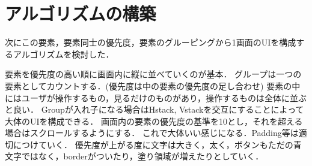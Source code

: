 \section{アルゴリズムの構築}
次にこの要素，要素同士の優先度，要素のグルーピングから1画面のUIを構成するアルゴリズムを検討した．

要素を優先度の高い順に画面内に縦に並べていくのが基本．
グループは一つの要素としてカウントする．(優先度は中の要素の優先度の足し合わせ)
要素の中にはユーザが操作するもの，見るだけのものがあり，操作するものは全体に並ぶと良い．
Groupが入れ子になる場合はHstack, Vstackを交互にすることによって大体のUIを構成できる．
画面内の要素の優先度の基準を10とし，それを超える場合はスクロールするようにする．
これで大体いい感じになる．Padding等は適切につけていく．
優先度が上がる度に文字は大きく，太く，ボタンもただの青文字ではなく，borderがついたり，塗り領域が増えたりとしていく．


